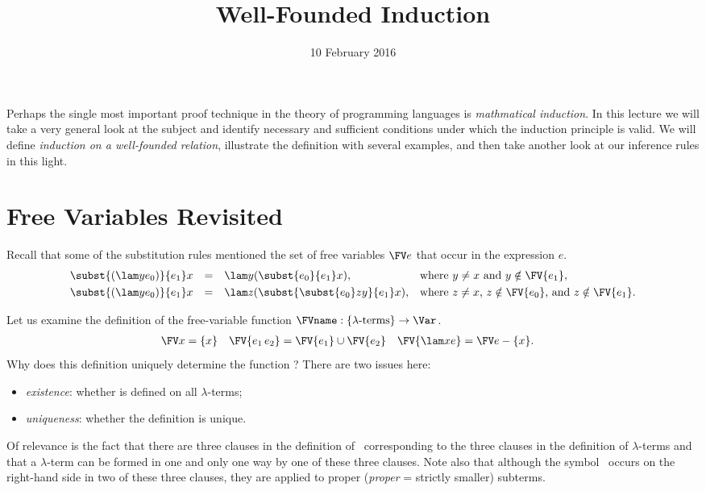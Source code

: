 \title{Well-Founded Induction}
\date{10 February 2016}
\maketitle

Perhaps the single most important proof technique in the theory of programming languages is \emph{mathmatical induction}. In this lecture we will take a very general look at the subject and identify necessary and sufficient conditions under which the induction principle is valid. We will define \emph{induction on a well-founded relation}, illustrate the definition with several examples, and then take another look at our inference rules in this light.

\section {Free Variables Revisited}

Recall that some of the substitution rules mentioned the set of free variables $\FV e$ that occur in the expression $e$.
\[
\begin{array}{rcll}
\subst{(\lam y{e_0})}{e_1}x &=& \lam y{(\subst{e_0}{e_1}x)}, & \mbox{where $y\neq x$ and $y\notin\FV{e_1}$},\\[3pt]
\subst{(\lam y{e_0})}{e_1}x &=& \lam z{(\subst{\subst{e_0}zy}{e_1}x)}, & \mbox{where $z\neq x$, $z\notin\FV{e_0}$, and $z\notin\FV{e_1}$}.
\end{array}
\]

\noindent
Let us examine the definition of the free-variable function $\FVname:\{\text{$\lambda$-terms}\}\to\Var$.
\begin{align*}
\FV x &= \{x\} &
\FV{e_1\,e_2} &= \FV{e_1} \cup \FV{e_2} &
\FV{\lam xe} &= \FV e - \{x\}.
\end{align*}
Why does this definition uniquely determine the function \FVname? There are two issues here:
\begin{itemize}
\item
\emph{existence}: whether  is defined on all $\lambda$-terms;
\item
\emph{uniqueness}: whether the definition is unique.
\end{itemize}
Of relevance is the fact that there are three clauses in the definition of \FVname\ corresponding to the three clauses in the definition of $\lambda$-terms and that a $\lambda$-term can be formed in one and only one way by one of these three clauses. Note also that although the symbol \FVname\ occurs on the right-hand side in two of these three clauses, they are applied to proper (\emph{proper} = strictly smaller) subterms.

